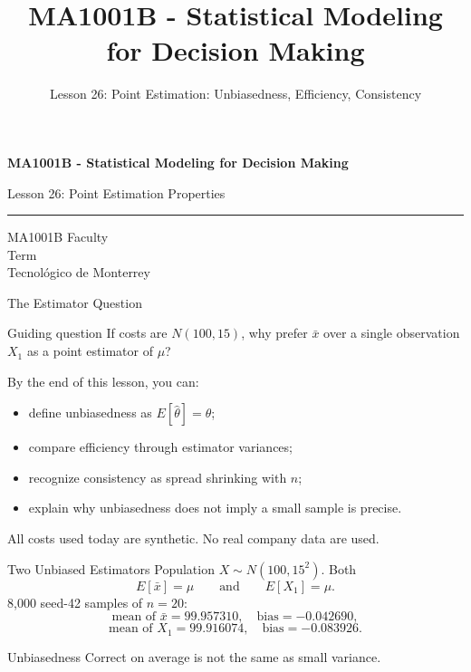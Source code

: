 \documentclass[aspectratio=169,10pt,english]{beamer}
\title{MA1001B - Statistical Modeling for Decision Making}
\subtitle{Lesson 26: Point Estimation: Unbiasedness, Efficiency, Consistency}
\author{}
\institute{Tecnol\'ogico de Monterrey}
\date{}
\begin{document}
\begin{frame}[plain]
  \vspace{1.2cm}
  {\Large\bfseries MA1001B - Statistical Modeling for Decision Making\par}
  \vspace{0.7cm}
  {\large Lesson 26: Point Estimation Properties\par}
  \vspace{0.7cm}
  {\color{TecRojo}\rule{\textwidth}{1.2pt}}
  \vspace{0.8cm}

  MA1001B Faculty\\[0.3cm]
  Term\\[0.3cm]
  Tecnol\'ogico de Monterrey
\end{frame}

\begin{frame}{The Estimator Question}
  \begin{alertblock}{Guiding question}
    If costs are $N(100,15)$, why prefer $\bar x$ over a single observation
    $X_1$ as a point estimator of $\mu$?
  \end{alertblock}

  \vspace{0.6em}
  By the end of this lesson, you can:
  \begin{itemize}
    \item define unbiasedness as $E[\hat\theta]=\theta$;
    \item compare efficiency through estimator variances;
    \item recognize consistency as spread shrinking with $n$;
    \item explain why unbiasedness does not imply a small sample is precise.
  \end{itemize}

  \vfill
  \scriptsize All costs used today are synthetic. No real company data are used.
\end{frame}

\begin{frame}{Two Unbiased Estimators}
  \small
  Population $X\sim N(100,15^2)$. Both
  \[
    E[\bar x]=\mu\qquad\text{and}\qquad E[X_1]=\mu.
  \]
  8{,}000 seed-42 samples of $n=20$:
  \[
    \text{mean of }\bar x=99.957310,\quad \text{bias}=-0.042690,
  \]
  \[
    \text{mean of }X_1=99.916074,\quad \text{bias}=-0.083926.
  \]

  \vspace{0.3em}
  \begin{exampleblock}{Unbiasedness}
    Correct on average is not the same as small variance.
  \end{exampleblock}
\end{frame}
\end{document}
